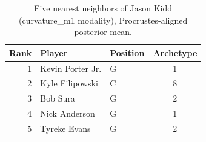 \begin{table}[htbp]
  \centering\small
  \begin{tabular}{rllc}
    \toprule
    Rank & Player & Position & Archetype \\
    \midrule
    1 & Kevin Porter Jr. & G & 1 \\
    2 & Kyle Filipowski & C & 8 \\
    3 & Bob Sura & G & 2 \\
    4 & Nick Anderson & G & 1 \\
    5 & Tyreke Evans & G & 2 \\
    \bottomrule
  \end{tabular}
  \caption{Five nearest neighbors of Jason Kidd (curvature_m1 modality), Procrustes-aligned posterior mean.}
  \label{tab:Jason_Kidd_neighbors_curvature_m1}
\end{table}

